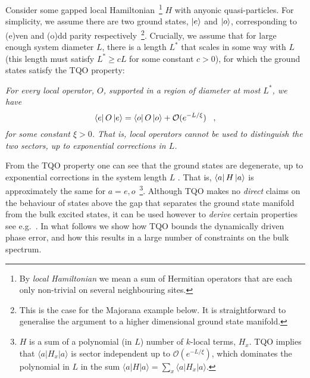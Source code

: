 \documentclass[aps,pra,floatfix,footinbib,longbibliography,twocolumn,superscriptaddress, preprintnumbers, nobibnotes]{revtex4-1}
\begin{document}
Consider some gapped local Hamiltonian~\footnote{By \emph{local Hamiltonian} we mean a sum of Hermitian operators that are each only non-trivial on several neighbouring sites.} $H$ with anyonic quasi-particles. For simplicity, we assume there are two ground states, $\left|e\right\rangle$ and $\left|o\right\rangle$, corresponding to (e)ven and (o)dd parity respectively~\footnote{This is the case for the Majorana example below. It is straightforward to generalise the argument to a higher dimensional ground state manifold.}. Crucially, we assume that for large enough system diameter $L$, there is a length $L^*$ that scales in some way with $L$ (this length must satisfy $L^*\geq c L$ for some constant $c>0$), for which the ground states satisfy the TQO property: 
\vspace{1mm}

\noindent \emph{For every local operator, $O$, supported in a region of diameter at most $L^*$, we have}
\begin{equation}\label{tqo_assumption}
\left\langle e\right|O\left|e\right\rangle = \left\langle o\right|O\left|o\right\rangle + \mathcal{O}(e^{-L /\xi})\;\;\; ,
\end{equation}
\emph{for some constant $\xi > 0 $. That is, local operators cannot be used to distinguish the two sectors, up to exponential corrections in $L$.}  
\vspace{1mm}

From the TQO property one can see that the ground states are degenerate, up to exponential corrections in the system length $L$ \cite{Bravyi2010h,Bravyi2011h}. That is, $\left\langle a\right|H\left|a\right\rangle$ is approximately the same for $a=e,o$~\footnote{$H$ is a sum of a polynomial (in $L$) number of $k$-local terms, $H_{x}$. TQO implies that {$ \langle a|H_{x} |a \rangle$} is sector independent up to $\mathcal{O}(e^{-L/\xi })$, which dominates the polynomial in $L$ in the sum {$\langle a| H |a \rangle = \sum_x \langle a|H_{x}|a \rangle$}.}.  Although TQO makes no {\em direct} claims on the behaviour of states above the gap that separates the ground state manifold from the bulk excited states, it can be used however to {\em derive} certain properties see e.g.~\cite{Bravyi2010h}. In what follows we show how TQO bounds the dynamically driven phase error, and how this results in a large number of constraints on the bulk spectrum. 
\end{document}
